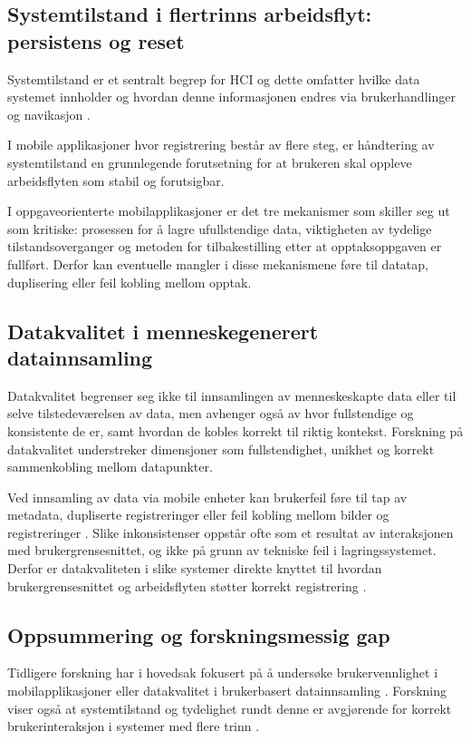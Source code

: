 \subsection{Systemtilstand i flertrinns arbeidsflyt: persistens og reset}
Systemtilstand er et sentralt begrep for HCI og dette omfatter hvilke data systemet innholder og hvordan denne informasjonen endres via brukerhandlinger og navikasjon \cite{norman2013}.

I mobile applikasjoner hvor registrering består av flere steg, er håndtering av systemtilstand en grunnlegende forutsetning for at brukeren skal oppleve arbeidsflyten som stabil og forutsigbar.

I oppgaveorienterte mobilapplikasjoner er det tre mekanismer som skiller seg ut som kritiske: prosessen for å lagre ufullstendige data, viktigheten av tydelige tilstandsoverganger og metoden for tilbakestilling etter at opptaksoppgaven er fullført. Derfor kan eventuelle mangler i disse mekanismene føre til datatap, duplisering eller feil kobling mellom opptak.

\subsection{Datakvalitet i menneskegenerert datainnsamling}
Datakvalitet begrenser seg ikke til innsamlingen av menneskeskapte data eller til selve tilstedeværelsen av data, men avhenger også av hvor fullstendige og konsistente de er, samt hvordan de kobles korrekt til riktig kontekst. Forskning på datakvalitet understreker dimensjoner som fullstendighet, unikhet og korrekt sammenkobling mellom datapunkter\cite{wang1996}. 

Ved innsamling av data via mobile enheter kan brukerfeil føre til tap av metadata, dupliserte registreringer eller feil kobling mellom bilder og registreringer \cite{muller2024}. Slike inkonsistenser oppstår ofte som et resultat av interaksjonen med brukergrensesnittet, og ikke på grunn av tekniske feil i lagringssystemet. Derfor er datakvaliteten i slike systemer direkte knyttet til hvordan brukergrensesnittet og arbeidsflyten støtter korrekt registrering \cite{weichbroth2024}.

\subsection{Oppsummering og forskningsmessig gap}
Tidligere forskning har i hovedsak fokusert på å undersøke brukervennlighet i mobilapplikasjoner \cite{weichbroth2024} eller datakvalitet i brukerbasert datainnsamling \cite{wang1996}. Forskning viser også at systemtilstand og tydelighet rundt denne er avgjørende for korrekt brukerinteraksjon i systemer med flere trinn \cite{nielsen1994}.

